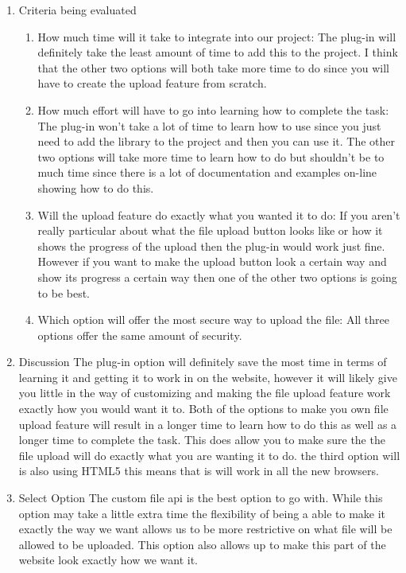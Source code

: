 \documentclass[letterpaper, 10pt, draftclsnofoot, compsoc, onecolumn]{IEEEtran}
\begin{document}
\begin{enumerate}
\begin{itemize}
				\end{itemize}
			\item{Criteria being evaluated}
				\begin{enumerate}
					\item How much time will it take to integrate into our project: The plug-in will definitely take the least amount of time to add this to the project. I 
					think that the other two options will both take more time to do since you will have to create the upload feature from scratch.
					\item How much effort will have to go into learning how to complete the task: The plug-in won't take a lot of time to learn how to use since you just 
					need to add the library to the project and then you can use it. The other two options will take more time to learn how to do but shouldn't be to much 
					time since there is a lot of documentation and examples on-line showing how to do this. 
					\item Will the upload feature do exactly what you wanted it to do: If you aren't really particular about what the file upload button looks like or how it shows
					the progress of the upload then the plug-in would work just fine. However if you want to make the upload button look a certain way and show its progress a
					certain way then one of the other two options is going to be best. 
					\item Which option will offer the most secure way to upload the file: All three options offer the same amount of security. 
				\end{enumerate}
			\item{Discussion} The plug-in option will definitely save the most time in terms of learning it and getting it to work in on the website, 
					however it will likely give you little in the way of customizing and making the file upload feature work exactly how you would want 
					it to. Both of the options to make you own file upload feature will result in a longer time to learn how to do this as well as a longer
					time to complete the task. This does allow you to make sure the the file upload will do exactly what you are wanting it to do. the 
					third option will is also using HTML5 this means that is will work in all the new browsers.
			\item{Select Option}
					The custom file api is the best option to go with. While this option may take a little extra time the flexibility of being a able to make it exactly
					the way we want allows us to be more restrictive on what file will be allowed to be uploaded. This option also allows up to make this part of the
					website look exactly how we want it.  
		\end{enumerate}
\end{document}
